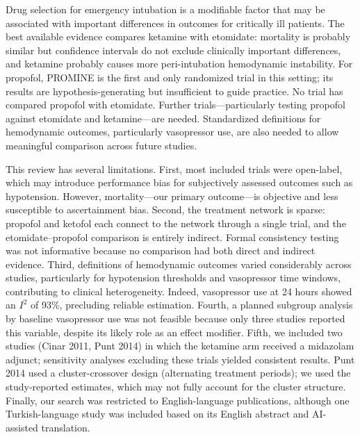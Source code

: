 \documentclass[11pt]{article}
\begin{document}
Drug selection for emergency intubation is a modifiable factor that may be associated with important differences in outcomes for critically ill patients. The best available evidence compares ketamine with etomidate: mortality is probably similar but confidence intervals do not exclude clinically important differences, and ketamine probably causes more peri-intubation hemodynamic instability. For propofol, PROMINE is the first and only randomized trial in this setting; its results are hypothesis-generating but insufficient to guide practice. No trial has compared propofol with etomidate. Further trials---particularly testing propofol against etomidate and ketamine---are needed. Standardized definitions for hemodynamic outcomes, particularly vasopressor use, are also needed to allow meaningful comparison across future studies.

This review has several limitations. First, most included trials were open-label, which may introduce performance bias for subjectively assessed outcomes such as hypotension. However, mortality---our primary outcome---is objective and less susceptible to ascertainment bias. Second, the treatment network is sparse: propofol and ketofol each connect to the network through a single trial, and the etomidate--propofol comparison is entirely indirect. Formal consistency testing was not informative because no comparison had both direct and indirect evidence. Third, definitions of hemodynamic outcomes varied considerably across studies, particularly for hypotension thresholds and vasopressor time windows, contributing to clinical heterogeneity. Indeed, vasopressor use at 24 hours showed an $I^2$ of 93\%, precluding reliable estimation. Fourth, a planned subgroup analysis by baseline vasopressor use was not feasible because only three studies reported this variable, despite its likely role as an effect modifier. Fifth, we included two studies (Cinar 2011,\cite{cinar2011} Punt 2014\cite{punt2014}) in which the ketamine arm received a midazolam adjunct; sensitivity analyses excluding these trials yielded consistent results. Punt 2014 used a cluster-crossover design (alternating treatment periods); we used the study-reported estimates, which may not fully account for the cluster structure. Finally, our search was restricted to English-language publications, although one Turkish-language study was included based on its English abstract and AI-assisted translation.

\end{document}
